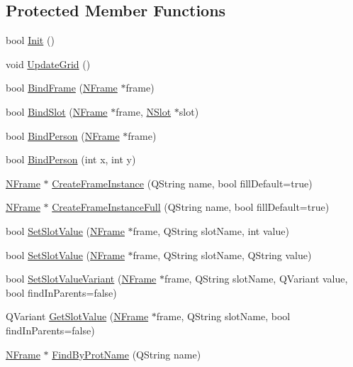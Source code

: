 \subsection*{Protected Member Functions}
\begin{DoxyCompactItemize}
\item 
bool \hyperlink{class_m_l_v_a9fadb85f4ade4580eaadbc4cb8902465}{Init} ()
\item 
void \hyperlink{class_m_l_v_a73969b6eb50ddf4da02bb4979564f6a5}{UpdateGrid} ()
\item 
bool \hyperlink{class_m_l_v_a16675f65763b1336acf4461c683a7f1b}{BindFrame} (\hyperlink{class_n_frame}{NFrame} $\ast$frame)
\item 
bool \hyperlink{class_m_l_v_a50007619b61d1d2efa64efa30d847d44}{BindSlot} (\hyperlink{class_n_frame}{NFrame} $\ast$frame, \hyperlink{class_n_slot}{NSlot} $\ast$slot)
\item 
bool \hyperlink{class_m_l_v_a78bde540ad8738bf28e00f0bd38a40e2}{BindPerson} (\hyperlink{class_n_frame}{NFrame} $\ast$frame)
\item 
bool \hyperlink{class_m_l_v_a00d61b95b6b4f6e91a74c7e936290712}{BindPerson} (int x, int y)
\item 
\hyperlink{class_n_frame}{NFrame} $\ast$ \hyperlink{class_m_l_v_a794cc9986b605755df84d7b3b3f70a34}{CreateFrameInstance} (QString name, bool fillDefault=true)
\item 
\hyperlink{class_n_frame}{NFrame} $\ast$ \hyperlink{class_m_l_v_a692fcc6afec6b41f8e5032a09959bfb6}{CreateFrameInstanceFull} (QString name, bool fillDefault=true)
\item 
bool \hyperlink{class_m_l_v_a80ef6b7ce96400b732ce3b9c0999f210}{SetSlotValue} (\hyperlink{class_n_frame}{NFrame} $\ast$frame, QString slotName, int value)
\item 
bool \hyperlink{class_m_l_v_ae6dfc4607e6d9006969e97b43c85c86b}{SetSlotValue} (\hyperlink{class_n_frame}{NFrame} $\ast$frame, QString slotName, QString value)
\item 
bool \hyperlink{class_m_l_v_a34f7bc0a28e4d1d83a11a7ed88889c00}{SetSlotValueVariant} (\hyperlink{class_n_frame}{NFrame} $\ast$frame, QString slotName, QVariant value, bool findInParents=false)
\item 
QVariant \hyperlink{class_m_l_v_afc7df83402f2aad79c3341ecf7bf3d9b}{GetSlotValue} (\hyperlink{class_n_frame}{NFrame} $\ast$frame, QString slotName, bool findInParents=false)
\item 
\hyperlink{class_n_frame}{NFrame} $\ast$ \hyperlink{class_m_l_v_ac7ef01922f36447c237495dca3e8dc98}{FindByProtName} (QString name)

\end{DoxyCompactItemize}
